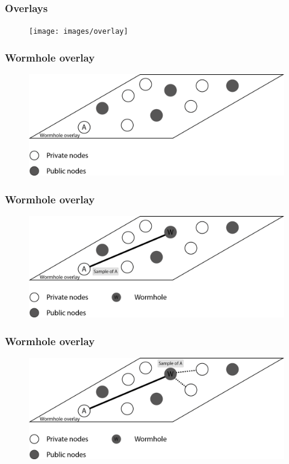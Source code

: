 \documentclass{beamer}
\begin{document}
\begin{frame}
\frametitle{Overlays}

\begin{figure}
\texttt{[image: images/overlay]}
\end{figure}

\end{frame}

\begin{frame}[noframenumbering]
\frametitle{Wormhole overlay}

\begin{figure}
\includegraphics[keepaspectratio=true, width=\textwidth]{images/wormhole_overlay_1.png}
\end{figure}
\end{frame}

\begin{frame}[noframenumbering]
\frametitle{Wormhole overlay}

\begin{figure}
\includegraphics[keepaspectratio=true, width=\textwidth]{images/wormhole_overlay_2.png}
\end{figure}
\end{frame}

\begin{frame}[noframenumbering]
\frametitle{Wormhole overlay}

\begin{figure}
\includegraphics[keepaspectratio=true, width=\textwidth]{images/wormhole_overlay_3.png}
\end{figure}
\end{frame}
\end{document}
